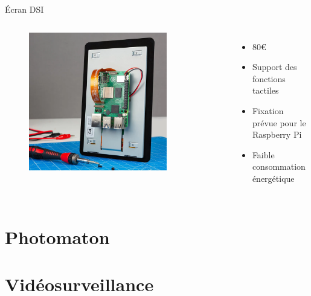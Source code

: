 \documentclass[aspectratio=169,xcolor=dvipsnames]{beamer}
\begin{document}
\begin{frame}{Écran DSI}
    \begin{columns}[c] %

        \begin{figure}
            \includegraphics[width=0.8\textwidth]{2/display-dsi.png}
        \end{figure}

        \begin{itemize}
            \item 80€
            \item Support des fonctions tactiles
            \item Fixation prévue pour le Raspberry Pi
            \item Faible consommation énergétique
        \end{itemize}

    \end{columns}
\end{frame}


\section{Photomaton}
\section{Vidéosurveillance}
\end{document}

